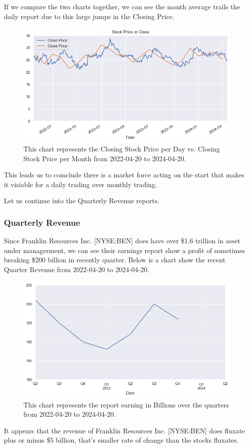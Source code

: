 \documentclass[9pt,a4paper,twoside]{tau}
\begin{document}
    If we compare the two charts together, we can see the month average trails the daily report due to this large jumps in the Closing Price.
        \begin{figure}[H]
            \centering
            \includegraphics[width=0.85\columnwidth]{images/CloseDataSet1dvs1mo.png}
            \caption{This chart represents the Closing Stock Price per Day vs. Closing Stock Price per Month from 2022-04-20 to 2024-04-20.}
            \label{fig:figure}
        \end{figure}
    This leads us to comclude there is a market force acting on the start that makes it visiable for a daily trading over monthly trading. 

    Let us continue into the Quarterly Revenue reports.

    \subsubsection{Quarterly Revenue}
        Since Franklin Resources Inc. [NYSE:BEN] does have over \$1.6 trillion in asset under managerment, we can see their earnings report show a profit of sometimes breaking \$200 billion in recently quarter. Below is a chart show the recent Quarter Revenue from 2022-04-20 to 2024-04-20.
            \begin{figure}[H]
                \centering
                \includegraphics[width=0.85\columnwidth]{images/EarningByQt.png}
                \caption{This chart represents the report earning in Billions over the quarters from 2022-04-20 to 2024-04-20.}
                \label{fig:figure}
            \end{figure}
        It appears that the revenue of Franklin Resources Inc. [NYSE:BEN] does fluxate plus or minus \$5 billion, that's smaller rate of change than the stocks fluxates.  
            
\end{document}
